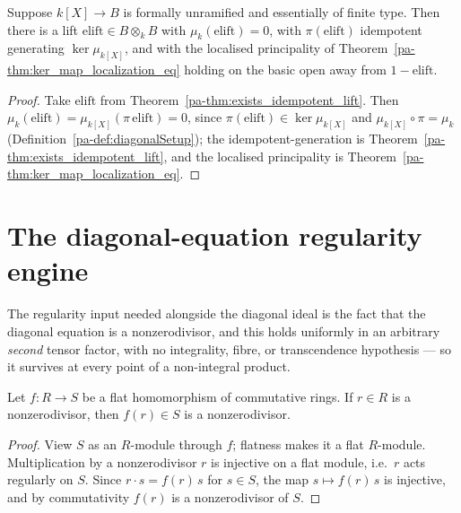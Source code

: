 \begin{theorem}
  \label{pa-thm:exists_diagonalLocalization}
  \leanok

  Suppose \(k[X] \to B\) is formally unramified and essentially of finite type. Then there is a
  lift \(\mathrm{elift} \in B \otimes_k B\) with \(\mu_k(\mathrm{elift}) = 0\), with
  \(\pi(\mathrm{elift})\) idempotent generating \(\ker \mu_{k[X]}\), and with the localised
  principality of Theorem~\ref{pa-thm:ker_map_localization_eq} holding on the basic open away from
  \(1 - \mathrm{elift}\).
\end{theorem}
\begin{proof}
  \leanok
  Take \(\mathrm{elift}\) from Theorem~\ref{pa-thm:exists_idempotent_lift}. Then
  \(\mu_k(\mathrm{elift}) = \mu_{k[X]}(\pi\,\mathrm{elift}) = 0\), since \(\pi(\mathrm{elift}) \in
  \ker \mu_{k[X]}\) and \(\mu_{k[X]} \circ \pi = \mu_k\) (Definition~\ref{pa-def:diagonalSetup}); the
  idempotent-generation is Theorem~\ref{pa-thm:exists_idempotent_lift}, and the localised
  principality is Theorem~\ref{pa-thm:ker_map_localization_eq}.
\end{proof}

\section{The diagonal-equation regularity engine}
\label{pa-sec:diagonal_regular}

The regularity input needed alongside the diagonal ideal is the fact that the diagonal
equation is a nonzerodivisor, and this holds uniformly in an arbitrary \emph{second} tensor
factor, with no integrality, fibre, or transcendence hypothesis — so it survives at every
point of a non-integral product.

\begin{lemma}
  \label{pa-lem:flat_mem_nonZeroDivisors}
  \leanok

  Let \(f \colon R \to S\) be a flat homomorphism of commutative rings. If \(r \in R\) is a
  nonzerodivisor, then \(f(r) \in S\) is a nonzerodivisor.
\end{lemma}
\begin{proof}
  \leanok
  View \(S\) as an \(R\)-module through \(f\); flatness makes it a flat \(R\)-module.
  Multiplication by a nonzerodivisor \(r\) is injective on a flat module, i.e.\ \(r\) acts
  regularly on \(S\). Since \(r \cdot s = f(r)\, s\) for \(s \in S\), the map \(s \mapsto f(r)\, s\)
  is injective, and by commutativity \(f(r)\) is a nonzerodivisor of \(S\).
\end{proof}

